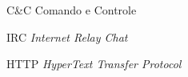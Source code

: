 \begin{siglas}
	\item[C\&C] Comando e Controle
	\item[IRC] \textit{Internet Relay Chat}
	\item[HTTP] \textit{HyperText Transfer Protocol}
\end{siglas}